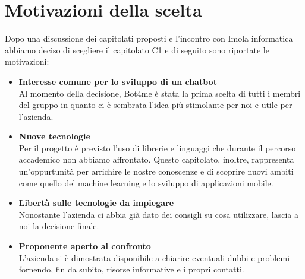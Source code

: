 \section{Motivazioni della scelta}
	Dopo una discussione dei capitolati proposti e l'incontro con Imola informatica abbiamo deciso di scegliere il capitolato C1 e di seguito sono riportate le motivazioni:
	\begin{itemize}
		\item \textbf{Interesse comune per lo sviluppo di un chatbot}\\ 
            Al momento della decisione, Bot4me è stata la prima scelta di tutti i membri del gruppo in quanto ci è sembrata l'idea più stimolante per noi e utile per l'azienda.
		\item \textbf{Nuove tecnologie}\\ 
            Per il progetto è previsto l'uso di librerie e linguaggi che durante il percorso accademico non abbiamo affrontato. Questo capitolato, inoltre, rappresenta 
            un'oppurtunità per arrichire le nostre conoscenze e di scoprire nuovi ambiti come quello del machine learning e lo sviluppo di applicazioni mobile.
		\item \textbf{Libertà sulle tecnologie da impiegare}\\ 
            Nonostante l'azienda ci abbia già dato dei consigli su cosa utilizzare, lascia a noi la decisione finale.
		\item \textbf{Proponente aperto al confronto}\\ 
            L'azienda si è dimostrata disponibile a chiarire eventuali dubbi e problemi fornendo, fin da subito, risorse informative e i propri contatti.
	\end{itemize}